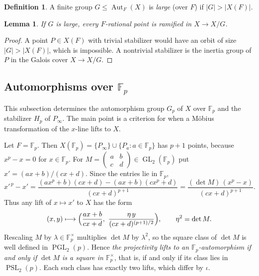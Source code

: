 \documentclass[12pt,letterpaper]{article}
\newtheorem{lemma}[theorem]{Lemma}
\theoremstyle{definition}
\newtheorem{definition}[theorem]{Definition}
\theoremstyle{remark}
\numberwithin{equation}{section}
\newcommand{\F}{\mathbb{F}}
\newcommand{\Aut}{\operatorname{Aut}}
\newcommand{\GL}{\operatorname{GL}}
\newcommand{\PSL}{\operatorname{PSL}}
\newcommand{\PGL}{\operatorname{PGL}}
\begin{document}
\begin{definition}
A finite group $G\le\Aut_F(X)$ is \emph{large} (over $F$) if
$|G|>|X(F)|$.
\end{definition}

\begin{lemma}\label{lem:large}
If $G$ is large, every $F$-rational point is ramified in $X\to X/G$.
\end{lemma}
\begin{proof}
A point $P\in X(F)$ with trivial stabilizer would have an orbit of size
$|G|>|X(F)|$, which is impossible.  A nontrivial stabilizer is the
inertia group of $P$ in the Galois cover $X\to X/G$.
\end{proof}

\subsection{\texorpdfstring{Automorphisms over $\F_p$}{Automorphisms over F\_p}}\label{subsec:fp}

This subsection determines the automorphism group $G_p$ of $X$ over
$\F_p$ and the stabilizer $H_p$ of $P_\infty$. The main point is a
criterion for when a M\"obius transformation of the $x$-line lifts to
$X$.

Let $F=\F_p$.  Then $X(\F_p)=\{P_\infty\}\cup\{P_a:a\in\F_p\}$ has
$p+1$ points, because $x^p-x=0$ for $x\in\F_p$.  For
$M=\begin{pmatrix}a&b\\c&d\end{pmatrix}\in\GL_2(\F_p)$ put
$x'=(ax+b)/(cx+d)$.  Since the entries lie in $\F_p$,
\begin{equation}\label{eq:mobius-identity}
x'^{\,p}-x'=\frac{(ax^p+b)(cx+d)-(ax+b)(cx^p+d)}{(cx+d)^{p+1}}
=\frac{(\det M)\,(x^p-x)}{(cx+d)^{p+1}}.
\end{equation}
Thus any lift of $x\mapsto x'$ to $X$ has the form
\begin{equation}\label{eq:lift}
(x,y)\longmapsto\Bigl(\frac{ax+b}{cx+d},\ \frac{\eta\,y}{(cx+d)^{(p+1)/2}}\Bigr),
\qquad\eta^2=\det M.
\end{equation}
Rescaling $M$ by $\lambda\in\F_p^\times$ multiplies $\det M$ by
$\lambda^2$, so the square class of $\det M$ is well defined in
$\PGL_2(p)$.  Hence \emph{the projectivity lifts to an
$\F_p$-automorphism if and only if $\det M$ is a square in $\F_p^\times$},
that is, if and only if its class lies in $\PSL_2(p)$.  Each such class
has exactly two lifts, which differ by $\iota$.
\end{document}
